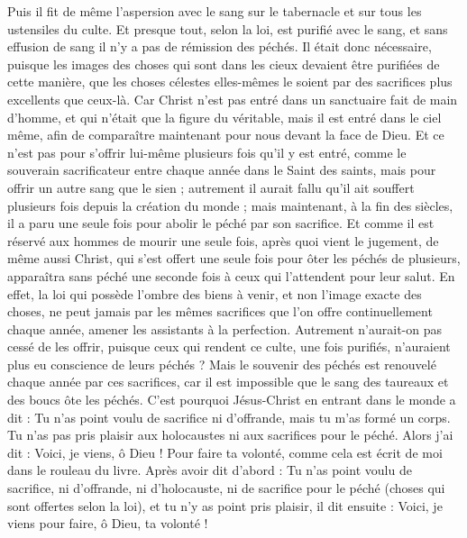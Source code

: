 \begin{multicols}{2}
Puis il fit de même l’aspersion avec le sang sur le tabernacle et sur tous les ustensiles du culte.
Et presque tout, selon la loi, est purifié avec le sang, et sans effusion de sang il n’y a pas de rémission des péchés.
Il était donc nécessaire, puisque les images des choses qui sont dans les cieux devaient être purifiées de cette manière, que les choses célestes elles-mêmes le soient par des sacrifices plus excellents que ceux-là.
Car Christ n'est pas entré dans un sanctuaire fait de main d’homme, et qui n’était que la figure du véritable, mais il est entré dans le ciel même, afin de comparaître maintenant pour nous devant la face de Dieu.
Et ce n’est pas pour s’offrir lui-même plusieurs fois qu’il y est entré, comme le souverain sacrificateur entre chaque année dans le Saint des saints, mais pour offrir un autre sang que le sien ;
autrement il aurait fallu qu'il ait souffert plusieurs fois depuis la création du monde ; mais maintenant, à la fin des siècles, il a paru une seule fois pour abolir le péché par son sacrifice.
Et comme il est réservé aux hommes de mourir une seule fois, après quoi vient le jugement,
de même aussi Christ, qui s’est offert une seule fois pour ôter les péchés de plusieurs, apparaîtra sans péché une seconde fois à ceux qui l'attendent pour leur salut.
\VerseOne{}En effet, la loi qui possède l'ombre des biens à venir, et non l’image exacte des choses, ne peut jamais par les mêmes sacrifices que l'on offre continuellement chaque année, amener les assistants à la perfection.
Autrement n’aurait-on pas cessé de les offrir, puisque ceux qui rendent ce culte, une fois purifiés, n’auraient plus eu conscience de leurs péchés ?
Mais le souvenir des péchés est renouvelé chaque année par ces sacrifices,
car il est impossible que le sang des taureaux et des boucs ôte les péchés.
C'est pourquoi Jésus-Christ en entrant dans le monde a dit : Tu n'as point voulu de sacrifice ni d'offrande, mais tu m'as formé un corps.
Tu n'as pas pris plaisir aux holocaustes ni aux sacrifices pour le péché.
Alors j'ai dit : Voici, je viens, ô Dieu ! Pour faire ta volonté, comme cela est écrit de moi dans le rouleau du livre.
Après avoir dit d’abord : Tu n'as point voulu de sacrifice, ni d'offrande, ni d'holocauste, ni de sacrifice pour le péché (choses qui sont offertes selon la loi), et tu n'y as point pris plaisir, il dit ensuite : Voici, je viens pour faire, ô Dieu, ta volonté !

\end{multicols}
